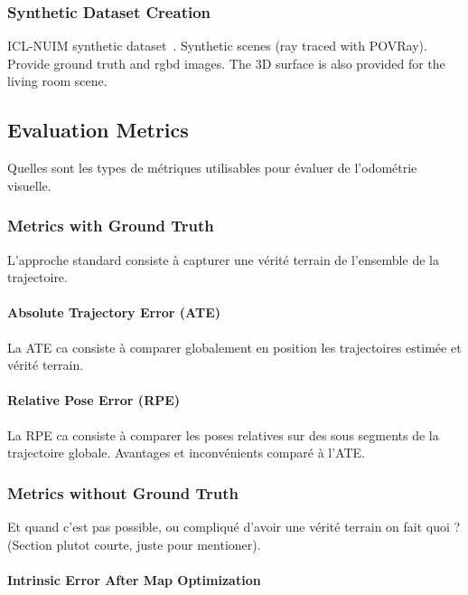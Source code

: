 \subsubsection{Synthetic Dataset Creation}%
\label{ssub:synthetic_dataset}

ICL-NUIM synthetic dataset~\cite{handa2014benchmark}.
Synthetic scenes (ray traced with POVRay).
Provide ground truth and rgbd images.
The 3D surface is also provided for the living room scene.

\subsection{Evaluation Metrics}%
\label{sub:metrics}

Quelles sont les types de métriques utilisables pour évaluer de l'odométrie visuelle.

\subsubsection{Metrics with Ground Truth}%
\label{ssub:metrics_gt}

L'approche standard consiste à capturer une vérité terrain de l'ensemble de la trajectoire.

\paragraph{Absolute Trajectory Error (ATE)}%
\label{par:ate}

La ATE ca consiste à comparer globalement en position les trajectoires
estimée et vérité terrain.

\paragraph{Relative Pose Error (RPE)}%
\label{par:rpe}

La RPE ca consiste à comparer les poses relatives sur des sous segments
de la trajectoire globale.
Avantages et inconvénients comparé à l'ATE.

\subsubsection{Metrics without Ground Truth}%
\label{ssub:metrics_no_gt}

Et quand c'est pas possible, ou compliqué d'avoir une vérité terrain
on fait quoi ? (Section plutot courte, juste pour mentioner).

\paragraph{Intrinsic Error After Map Optimization}%
\label{par:map_optim}

